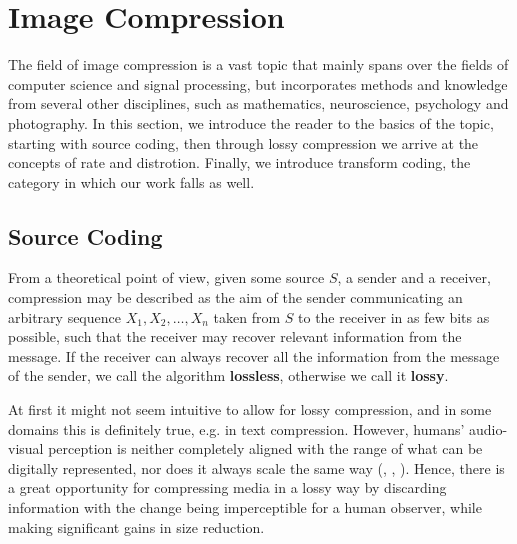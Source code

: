 \section{Image Compression}
\label{sec:intro_image_compression}
\par
The field of image compression is a vast topic that mainly spans over the fields
of computer science and signal processing, but incorporates methods and
knowledge from several
other disciplines, such as mathematics, neuroscience, psychology
and photography. In this section, we introduce the reader to the basics of the
topic, starting with source coding, then through lossy compression we arrive at
the concepts of rate and distrotion. Finally, we introduce transform coding, the
category in which our work falls as well.

\subsection{Source Coding}
From a theoretical point of view, given some source $S$, a sender and a
receiver, compression may be described as the aim of the sender communicating an
arbitrary sequence $X_1, X_2, \hdots, X_n$ taken from $S$ to the receiver in as few bits
as possible, such that the receiver may recover relevant information from the message.
If the receiver can always recover all the information from the message of the sender, we
call the algorithm \textbf{lossless}, otherwise we call it \textbf{lossy}. 
\par
At first it might not seem intuitive to allow for lossy compression, and in some
domains this is definitely true, e.g. in text compression. However, 
humans' audio-visual perception is neither completely aligned with the range of
what can be digitally represented, nor does it always scale the same way
(\cite{eskicioglu1994image}, \cite{psnr}, \cite{gupta2011modified}). Hence,
there is a great opportunity for compressing media in a lossy way by discarding
information with the change being imperceptible for a human observer, while
making significant gains in size reduction.
